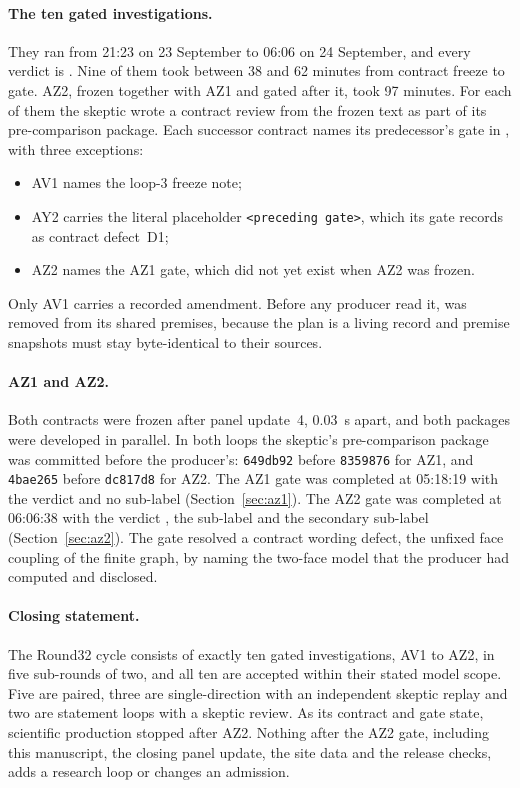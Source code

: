 \paragraph{The ten gated investigations.}
They ran from 21:23 on 23 September to 06:06 on 24 September, and every
verdict is . Nine of them took between 38 and
62 minutes from contract freeze to gate. AZ2, frozen together with AZ1 and
gated after it, took 97 minutes. For each of them the skeptic wrote a
contract review from the frozen text as part of its pre-comparison
package. Each
successor contract names its predecessor's
gate in , with three exceptions:
\begin{itemize}
\item AV1 names the loop-3 freeze note;
\item AY2 carries the literal placeholder \texttt{<preceding gate>}, which its
gate records as contract defect~D1;
\item AZ2 names the AZ1 gate, which did not yet exist when AZ2 was frozen.
\end{itemize}
Only AV1 carries a recorded amendment. Before any producer read it,  was removed from its shared
premises, because the plan is a living record and premise snapshots must stay
byte-identical to their sources.

\paragraph{AZ1 and AZ2.}
Both contracts were frozen after panel update~4, 0.03~s apart, and both
packages were developed in parallel. In both loops the skeptic's
pre-comparison package was committed before the producer's: \texttt{649db92}
before \texttt{8359876} for AZ1, and \texttt{4bae265} before \texttt{dc817d8}
for AZ2. The AZ1 gate was completed at 05:18:19 with the verdict
 and no sub-label (Section~\ref{sec:az1}). The
AZ2 gate was completed at 06:06:38 with the verdict
, the sub-label
 and the secondary sub-label
 (Section~\ref{sec:az2}). The gate resolved a contract wording defect, the
unfixed face coupling of the finite graph, by naming the two-face model that
the producer had computed and disclosed.

\paragraph{Closing statement.}
The Round32 cycle consists of exactly ten gated investigations, AV1 to AZ2,
in five sub-rounds of two, and all ten are accepted within their stated model
scope. Five are paired, three are single-direction with an independent
skeptic replay and two are statement loops with a skeptic review. As its
contract and gate state, scientific production stopped after AZ2. Nothing
after the AZ2 gate, including this manuscript, the closing panel update, the
site data and the release checks, adds a research loop or changes an
admission.

